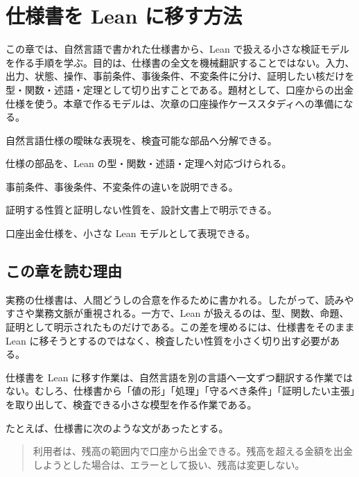 \chapter{仕様書を Lean に移す方法}
\label{chap:spec-to-lean}

\begin{chapterabstract}
この章では、自然言語で書かれた仕様書から、Lean で扱える小さな検証モデルを作る手順を学ぶ。目的は、仕様書の全文を機械翻訳することではない。入力、出力、状態、操作、事前条件、事後条件、不変条件に分け、証明したい核だけを型・関数・述語・定理として切り出すことである。題材として、口座からの出金仕様を使う。本章で作るモデルは、次章の口座操作ケーススタディへの準備になる。
\end{chapterabstract}

\begin{learninggoals}
\item 自然言語仕様の曖昧な表現を、検査可能な部品へ分解できる。
\item 仕様の部品を、Lean の型・関数・述語・定理へ対応づけられる。
\item 事前条件、事後条件、不変条件の違いを説明できる。
\item 証明する性質と証明しない性質を、設計文書上で明示できる。
\item 口座出金仕様を、小さな Lean モデルとして表現できる。
\end{learninggoals}

\section{この章を読む理由}

実務の仕様書は、人間どうしの合意を作るために書かれる。したがって、読みやすさや業務文脈が重視される。一方で、Lean が扱えるのは、型、関数、命題、証明として明示されたものだけである。この差を埋めるには、仕様書をそのまま Lean に移そうとするのではなく、検査したい性質を小さく切り出す必要がある。

\begin{intuitionbox}
仕様書を Lean に移す作業は、自然言語を別の言語へ一文ずつ翻訳する作業ではない。むしろ、仕様書から「値の形」「処理」「守るべき条件」「証明したい主張」を取り出して、検査できる小さな模型を作る作業である。
\end{intuitionbox}

たとえば、仕様書に次のような文があったとする。

\begin{quote}
利用者は、残高の範囲内で口座から出金できる。残高を超える金額を出金しようとした場合は、エラーとして扱い、残高は変更しない。
\end{quote}

